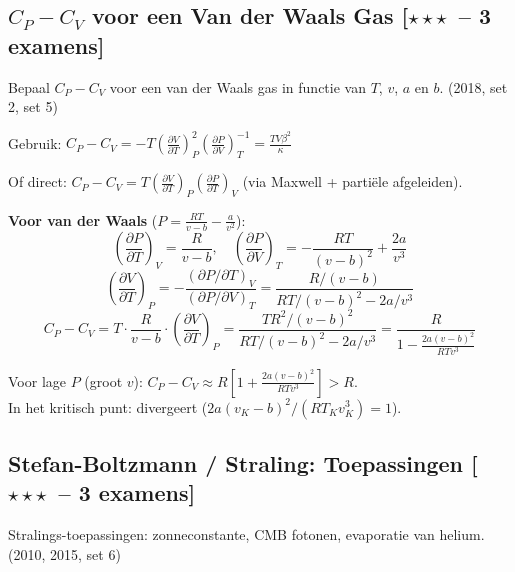 \documentclass[10pt,a4paper]{article}
\newcommand{\pder}[2]{\left(\frac{\partial #1}{\partial #2}\right)}
\begin{document}
\subsection{$C_P - C_V$ voor een Van der Waals Gas \textnormal{\color{warningred}[$\star\star\star$\ -- 3 examens]}}

\begin{oefening}{Bepaal $C_P - C_V$ voor een van der Waals gas in functie van $T$, $v$, $a$ en $b$. \textnormal{(2018, set 2, set 5)}}
\end{oefening}

\begin{oplossing}
Gebruik: $C_P - C_V = -T\pder{V}{T}^2_P \pder{P}{V}^{-1}_T = \frac{TV\beta^2}{\kappa}$

Of direct: $C_P - C_V = T\pder{V}{T}_P\pder{P}{T}_V$ (via Maxwell + partiële afgeleiden).

\textbf{Voor van der Waals} ($P = \frac{RT}{v-b} - \frac{a}{v^2}$):
$$\pder{P}{T}_V = \frac{R}{v-b}, \quad \pder{P}{V}_T = -\frac{RT}{(v-b)^2} + \frac{2a}{v^3}$$
$$\pder{V}{T}_P = -\frac{(\partial P/\partial T)_V}{(\partial P/\partial V)_T} = \frac{R/(v-b)}{RT/(v-b)^2 - 2a/v^3}$$
$$C_P - C_V = T \cdot \frac{R}{v-b} \cdot \pder{V}{T}_P = \frac{TR^2/(v-b)^2}{RT/(v-b)^2 - 2a/v^3} = \frac{R}{1 - \frac{2a(v-b)^2}{RTv^3}}$$

Voor lage $P$ (groot $v$): $C_P - C_V \approx R\left[1 + \frac{2a(v-b)^2}{RTv^3}\right] > R$.\\
In het kritisch punt: divergeert ($2a(v_K-b)^2/(RT_Kv_K^3) = 1$).
\end{oplossing}

\subsection{Stefan-Boltzmann / Straling: Toepassingen \textnormal{\color{warningred}[$\star\star\star$\ -- 3 examens]}}

\begin{oefening}{Stralings-toepassingen: zonneconstante, CMB fotonen, evaporatie van helium. \textnormal{(2010, 2015, set 6)}}
\end{oefening}
\end{document}
